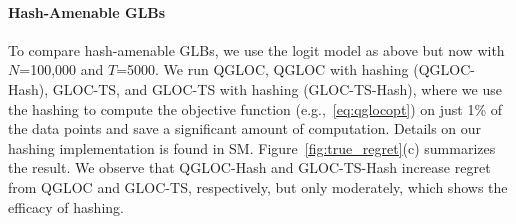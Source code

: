 \paragraph{Hash-Amenable GLBs}\quad
%
To compare hash-amenable GLBs, we use the logit model as above but now with $N$=100,000 and $T$=5000.
We run QGLOC, QGLOC with hashing (QGLOC-Hash), GLOC-TS, and GLOC-TS with hashing (GLOC-TS-Hash), where we use the hashing to compute the objective function (e.g.,~\eqref{eq:qglocopt}) on just 1\% of the data points and save a significant amount of computation.
Details on our hashing implementation is found in SM.
Figure~\ref{fig:true_regret}(c) summarizes the result. 
We observe that QGLOC-Hash and GLOC-TS-Hash increase regret from QGLOC and GLOC-TS, respectively, but only moderately, which shows the efficacy of hashing.

